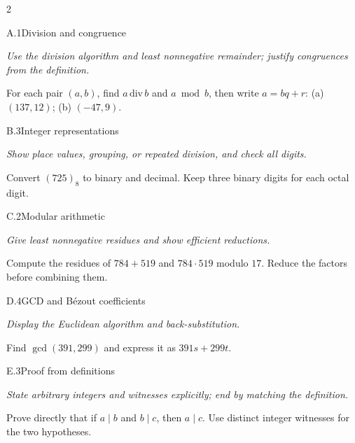 \documentclass[9pt]{extarticle}
\begin{document}
\begin{multicols}{2}
\begin{CoreProblem}{A.1}{Division and congruence}
{\scriptsize\textit{Use the division algorithm and least nonnegative remainder; justify congruences from the definition.}\par}
For each pair $(a,b)$, find $a\,\mathrm{div}\,b$ and $a\bmod b$, then write
$a=bq+r$: (a) $(137,12)$; (b) $(-47,9)$.
\end{CoreProblem}
\begin{CoreProblem}{B.3}{Integer representations}
{\scriptsize\textit{Show place values, grouping, or repeated division, and check all digits.}\par}
Convert $(725)_8$ to binary and decimal. Keep three binary digits for each
octal digit.
\end{CoreProblem}
\begin{CoreProblem}{C.2}{Modular arithmetic}
{\scriptsize\textit{Give least nonnegative residues and show efficient reductions.}\par}
Compute the residues of $784+519$ and $784\cdot519$ modulo $17$. Reduce the
factors before combining them.
\end{CoreProblem}
\columnbreak
\begin{CoreProblem}{D.4}{GCD and B\'ezout coefficients}
{\scriptsize\textit{Display the Euclidean algorithm and back-substitution.}\par}
Find $\gcd(391,299)$ and express it as $391s+299t$.
\end{CoreProblem}
\begin{CoreProblem}{E.3}{Proof from definitions}
{\scriptsize\textit{State arbitrary integers and witnesses explicitly; end by matching the definition.}\par}
Prove directly that if $a\mid b$ and $b\mid c$, then $a\mid c$. Use distinct
integer witnesses for the two hypotheses.
\end{CoreProblem}
\end{multicols}
\CoreWorkArea
\FormBreak
{}
\end{document}

